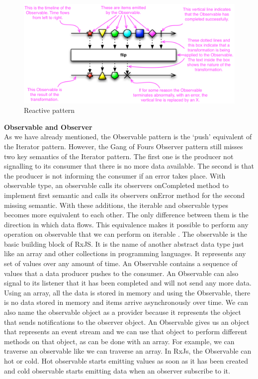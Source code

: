 \begin{figure}[!h]
	\centering
	\includegraphics[scale=0.5,trim=0 0 0 0]{gfx/rxjs-reactive-pattern2.png}
	\caption{Reactive pattern \protect\cite{ReactiveXobservable}}
	\label{fig:rxjs-reactive-pattern}
\end{figure}

\textbf{Observable and Observer}\\
As we have already mentioned, the Observable pattern is the `push' equivalent of the Iterator pattern. However, the Gang of Four\textquotesingle s Observer pattern \cite{Gamma:1995:DPE:186897} still misses two key semantics of the Iterator pattern. The first one is the producer not signalling to its consumer that there is no more data available. The second is that the producer is not informing the consumer if an error takes place. With observable type, an observable calls its observer\textquotesingle s onCompleted method to implement first semantic and calls its observer\textquotesingle s onError method for the second missing semantic. With these additions, the iterable and observable types becomes more equivalent to each other. The only difference between them is the direction in which data flows. This equivalence makes it possible to perform any operation on observable that we can perform on iterable \cite{reactivex}.
The observable is the basic building block of RxJS. It is the name of another abstract data type just like an array and other collections in programming languages. It represents any set of values over any amount of time. An Observable contains a sequence of values that a data producer pushes to the consumer. An Observable can also signal to its listener that it has been completed and will not send any more data. Using an array, all the data is stored in memory and using the Observable, there is no data stored in memory and items arrive asynchronously over time. We can also name the observable object as a provider because it represents the object that sends notifications to the observer object.
An Observable gives us an object that represents an event stream and we can use that object to perform different methods on that object, as can be done with an array. For example, we can traverse an observable like we can traverse an array. In RxJs, the Observable can hot or cold. Hot observable starts emitting values as soon as it has been created and cold observable starts emitting data when an observer subscribe to it.

